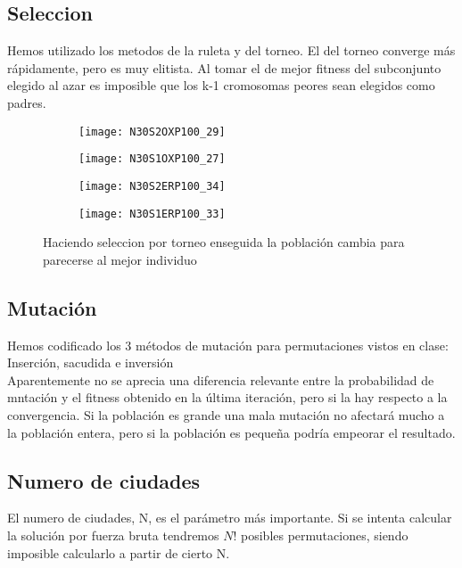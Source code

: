 \documentclass[10pt]{article}
\begin{document}
\subsection{Seleccion}
Hemos utilizado los metodos de la ruleta y del torneo. El del torneo converge más rápidamente, pero es muy elitista. Al tomar el de mejor fitness del subconjunto elegido al azar es imposible que los k-1 cromosomas peores sean elegidos como padres.
\begin{figure}[H]
	\begin{subfigure}[H]{0.50\textwidth}
		\texttt{[image: N30S2OXP100\_29]}
	\end{subfigure}%
	\begin{subfigure}[H]{0.50\textwidth}
		\texttt{[image: N30S1OXP100\_27]}
	\end{subfigure}
	\begin{subfigure}[H]{0.50\textwidth}
		\texttt{[image: N30S2ERP100\_34]}
	\end{subfigure}%
	\begin{subfigure}[H]{0.50\textwidth}
		\texttt{[image: N30S1ERP100\_33]}
	\end{subfigure}%
	\caption{Haciendo seleccion por torneo enseguida la población cambia para parecerse al mejor individuo}
\end{figure}
\par
\subsection{Mutación}
Hemos codificado los 3 métodos de mutación para permutaciones vistos en clase: Inserción, sacudida e inversión\\
Aparentemente no se aprecia una diferencia relevante entre la probabilidad de mntación y el fitness obtenido en la última iteración, pero si la hay respecto a la convergencia. Si la población es grande una mala mutación no afectará mucho a la población entera, pero si la población es pequeña podría empeorar el resultado.
\subsection{Numero de ciudades}
El numero de ciudades, N, es el parámetro más importante. Si se intenta calcular la solución por fuerza bruta tendremos $N!$ posibles permutaciones, siendo imposible calcularlo a partir de cierto N. 
\end{document}

